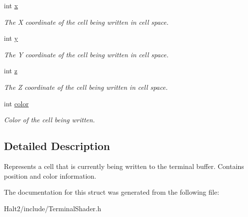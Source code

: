 \begin{DoxyCompactItemize}
\item 
\hypertarget{structhalt_1_1_terminal_shader_input_a96c795aaf2d7054a92e6cd8bd7b30518}{int \hyperlink{structhalt_1_1_terminal_shader_input_a96c795aaf2d7054a92e6cd8bd7b30518}{x}}\label{structhalt_1_1_terminal_shader_input_a96c795aaf2d7054a92e6cd8bd7b30518}

\begin{DoxyCompactList}\small\item\em \-The \-X coordinate of the cell being written in cell space. \end{DoxyCompactList}\item 
\hypertarget{structhalt_1_1_terminal_shader_input_a1e52e7305bc68e9e14b305dc1945e4a1}{int \hyperlink{structhalt_1_1_terminal_shader_input_a1e52e7305bc68e9e14b305dc1945e4a1}{y}}\label{structhalt_1_1_terminal_shader_input_a1e52e7305bc68e9e14b305dc1945e4a1}

\begin{DoxyCompactList}\small\item\em \-The \-Y coordinate of the cell being written in cell space. \end{DoxyCompactList}\item 
\hypertarget{structhalt_1_1_terminal_shader_input_a89eb904deb9910634e25216bf0196350}{int \hyperlink{structhalt_1_1_terminal_shader_input_a89eb904deb9910634e25216bf0196350}{z}}\label{structhalt_1_1_terminal_shader_input_a89eb904deb9910634e25216bf0196350}

\begin{DoxyCompactList}\small\item\em \-The \-Z coordinate of the cell being written in cell space. \end{DoxyCompactList}\item 
\hypertarget{structhalt_1_1_terminal_shader_input_a7effc203b6f9380536b08e518ae25a03}{int \hyperlink{structhalt_1_1_terminal_shader_input_a7effc203b6f9380536b08e518ae25a03}{color}}\label{structhalt_1_1_terminal_shader_input_a7effc203b6f9380536b08e518ae25a03}

\begin{DoxyCompactList}\small\item\em \-Color of the cell being written. \end{DoxyCompactList}\end{DoxyCompactItemize}


\subsection{\-Detailed \-Description}
\-Represents a cell that is currently being written to the terminal buffer. \-Contains position and color information. 

\-The documentation for this struct was generated from the following file\-:\begin{DoxyCompactItemize}
\item 
\-Halt2/include/\-Terminal\-Shader.\-h\end{DoxyCompactItemize}
